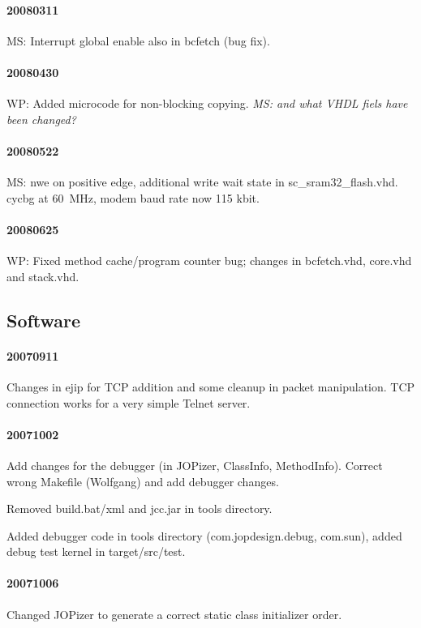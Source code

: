 \documentclass[a4paper,12pt]{scrartcl}
\newcommand{\code}[1]{{\textsf{#1}}}
\begin{document}
\paragraph{20080311} MS: Interrupt global enable also in \code{bcfetch} (bug
fix).

\paragraph{20080430} WP: Added microcode for non-blocking copying.
\emph{MS: and what VHDL fiels have been changed?}

\paragraph{20080522} MS: \code{nwe} on positive edge, additional
write wait state in \code{sc\_sram32\_flash.vhd}. \code{cycbg} at
60~MHz, modem baud rate now 115 kbit.

\paragraph{20080625} WP: Fixed method cache/program counter bug; changes in
\code{bcfetch.vhd}, \code{core.vhd} and \code{stack.vhd}.

\subsection{Software}

\paragraph{20070911} Changes in ejip for TCP addition and some
cleanup in packet manipulation. TCP connection works for a very simple
Telnet server.

\paragraph{20071002} Add changes for the debugger (in JOPizer, ClassInfo, MethodInfo).
Correct wrong Makefile (Wolfgang) and add debugger changes.

Removed build.bat/xml and jcc.jar in tools directory.

Added debugger code in tools directory (com.jopdesign.debug,
com.sun), added debug test kernel in target/src/test.

\paragraph{20071006} Changed JOPizer to generate a correct static
class initializer order.
\end{document}
